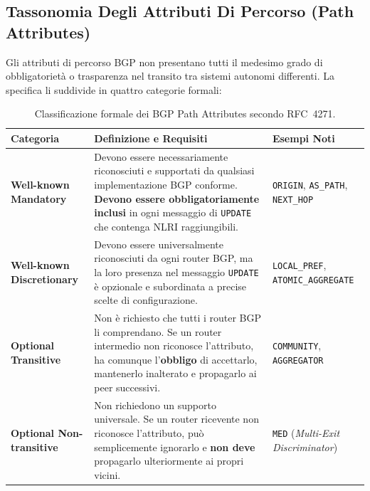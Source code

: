 \documentclass[11pt, a4paper]{article}
\begin{document}
\subsection{Tassonomia Degli Attributi Di Percorso (Path Attributes)}

Gli attributi di percorso BGP non presentano tutti il medesimo grado di obbligatorietà o trasparenza nel transito tra sistemi autonomi differenti. La specifica li suddivide in quattro categorie formali:


\begin{table}[H]
\centering
\small
\begin{tabularx}{\textwidth}{l p{5.5cm} X}
\toprule
\textbf{Categoria} & \textbf{Definizione e Requisiti} & \textbf{Esempi Noti} \\
\midrule
\textbf{Well-known Mandatory} &
Devono essere necessariamente riconosciuti e supportati da qualsiasi implementazione BGP conforme. \textbf{Devono essere obbligatoriamente inclusi} in ogni messaggio di \texttt{UPDATE} che contenga NLRI raggiungibili. &
\texttt{ORIGIN}, \texttt{AS\_PATH}, \texttt{NEXT\_HOP} \\
\addlinespace
\textbf{Well-known Discretionary} &
Devono essere universalmente riconosciuti da ogni router BGP, ma la loro presenza nel messaggio \texttt{UPDATE} è opzionale e subordinata a precise scelte di configurazione. &
\texttt{LOCAL\_PREF}, \texttt{ATOMIC\_AGGREGATE} \\
\addlinespace
\textbf{Optional Transitive} &
Non è richiesto che tutti i router BGP li comprendano. Se un router intermedio non riconosce l'attributo, ha comunque l'\textbf{obbligo} di accettarlo, mantenerlo inalterato e propagarlo ai peer successivi. &
\texttt{COMMUNITY}, \texttt{AGGREGATOR} \\
\addlinespace
\textbf{Optional Non-transitive} &
Non richiedono un supporto universale. Se un router ricevente non riconosce l'attributo, può semplicemente ignorarlo e \textbf{non deve} propagarlo ulteriormente ai propri vicini. &
\texttt{MED} (\emph{Multi-Exit Discriminator}) \\
\bottomrule
\end{tabularx}
\caption{Classificazione formale dei BGP Path Attributes secondo RFC~4271.}
\end{table}
\end{document}
